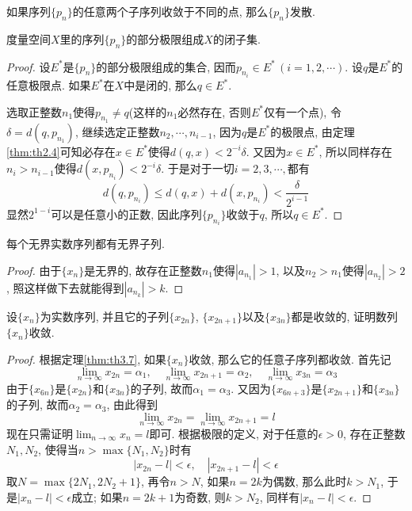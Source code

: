 \documentclass[cn,12pt,math=mtpro2,citestyle=gb7714-2015,bibstyle=gb7714-2015,twocol]{elegantbook}
\newcommand{\limn}{\lim_{n\to\infty}}
\begin{document}
\begin{corollary}
如果序列$\{p_n\}$的任意两个子序列收敛于不同的点, 那么$\{p_n\}$发散.
\end{corollary}
\begin{theorem}
  度量空间$X$里的序列$\{p_n\}$的部分极限组成$X$的闭子集.
\end{theorem}
\begin{proof}
  设$E^\ast$是$\{p_n\}$的部分极限组成的集合, 因而$p_{n_i}\in E^\ast \,(i=1,2,\cdots)$. 设$q$是$E^\ast$的任意极限点. 如果$E^\ast$在$X$中是闭的, 那么$q\in E^\ast$.

  选取正整数$n_1$使得$p_{n_1}\neq q$(这样的$n_1$必然存在, 否则$E^\ast$仅有一个点), 令$\delta=d(q,p_{n_1})$, 继续选定正整数$n_2,\cdots,n_{i-1}$, 因为$q$是$E^\ast$的极限点, 由定理\ref{thm:th2.4}可知必存在$x\in E^\ast$使得$d(q,x)<2^{-i}\delta$. 又因为$x\in E^\ast$, 所以同样存在$n_i>n_{i-1}$使得$d(x,p_ {n_i})<2^{-i}\delta$. 于是对于一切$i=2,3,\cdots,$都有
  $$d(q,p_{n_i})\leq d(q,x)+d(x,p_{n_i})<\frac{\delta}{2^{i-1}}$$
  显然$2^{1-i}$可以是任意小的正数, 因此序列$\{p_{n_i}\}$收敛于$q$, 所以$q\in E^\ast$.
\end{proof}

\begin{example}
每个无界实数序列都有无界子列.
\end{example}
\begin{proof}
  由于$\{x_n\}$是无界的, 故存在正整数$n_1$使得$|a_{n_1}|>1$, 以及$n_2>n_1$使得$|a_{n_2}|>2$, 照这样做下去就能得到$|a_{n_k}|>k$.
\end{proof}

\begin{example}
设$\{x_n\}$为实数序列, 并且它的子列$\{x_{2n}\}$, $\{x_{2n+1}\}$以及$\{x_{3n}\}$都是收敛的, 证明数列$\{x_n\}$收敛.
\end{example}
\begin{proof}
  根据定理\ref{thm:th3.7}, 如果$\{x_n\}$收敛, 那么它的任意子序列都收敛. 首先记
  $$\limn x_{2n}=\alpha_1,\quad \limn x_{2n+1}=\alpha_2,\quad \limn x_{3n}=\alpha_3$$
  由于$\{x_{6n}\}$是$\{x_{2n}\}$和$\{x_{3n}\}$的子列, 故而$\alpha_1=\alpha_3$. 又因为$\{x_{6n+3}\}$是$\{x_{2n+1}\}$和$\{x_{3n}\}$的子列, 故而$\alpha_2=\alpha_3$, 由此得到
  $$\limn x_{2n}=\limn x_{2n+1}=l$$
  现在只需证明$\limn x_n=l$即可. 根据极限的定义, 对于任意的$\epsilon>0$, 存在正整数$N_1,N_2$, 使得当$n>\max\{N_1,N_2\}$时有
  $$|x_{2n}-l|<\epsilon,\quad |x_{2n+1}-l|<\epsilon$$
  取$N=\max\{2N_1,2N_2+1\}$, 再令$n>N$, 如果$n=2k$为偶数, 那么此时$k>N_1$, 于是$|x_n-l|<\epsilon$成立; 如果$n=2k+1$为奇数, 则$k>N_2$, 同样有$|x_n-l|<\epsilon$.
\end{proof}
\end{document}
